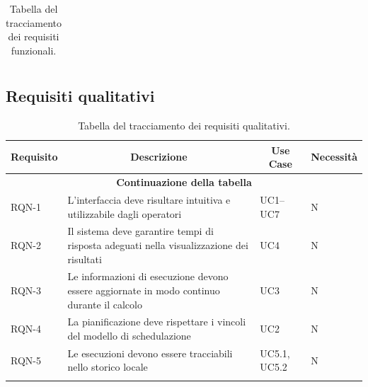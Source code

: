 \begin{center}
\begin{longtable}{|p{2.1cm}|p{6.9cm}|p{2.0cm}|p{2.0cm}|}
\caption{Tabella del tracciamento dei requisiti funzionali.}
\label{tab:requisiti_funzionali}
\end{longtable}
\end{center}

\subsection{Requisiti qualitativi}

\begin{center}
\begin{longtable}{|p{2.1cm}|p{6.9cm}|p{2.0cm}|p{2.0cm}|}
\hline
\multicolumn{1}{|c|}{\textbf{Requisito}} &
\multicolumn{1}{c|}{\textbf{Descrizione}} &
\multicolumn{1}{c|}{\textbf{Use Case}} &
\multicolumn{1}{c|}{\textbf{Necessità}} \\
\hline
\endfirsthead
\hline
\multicolumn{4}{c}{{\bfseries Continuazione della tabella}}\\
\hline
\endhead

RQN-1 & L'interfaccia deve risultare intuitiva e utilizzabile dagli operatori & UC1--UC7 & N \\
\hline
RQN-2 & Il sistema deve garantire tempi di risposta adeguati nella visualizzazione dei risultati & UC4 & N \\
\hline
RQN-3 & Le informazioni di esecuzione devono essere aggiornate in modo continuo durante il calcolo & UC3 & N \\
\hline
RQN-4 & La pianificazione deve rispettare i vincoli del modello di schedulazione & UC2 & N \\
\hline
RQN-5 & Le esecuzioni devono essere tracciabili nello storico locale & UC5.1, UC5.2 & N \\
\hline
\caption{Tabella del tracciamento dei requisiti qualitativi.}
\label{tab:requisiti_qualitativi}
\end{longtable}
\end{center}
\vspace{0.15cm}
